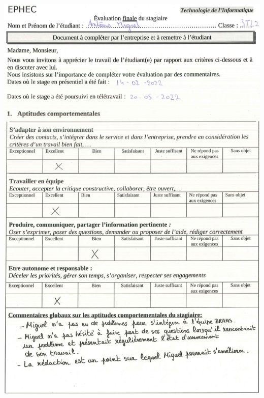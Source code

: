 \documentclass[11pt]{article}
\begin{document}
\includegraphics[scale=0.39]{Screenshot from 2022-05-22 20-51-34.png}

\newpage
\end{document}
